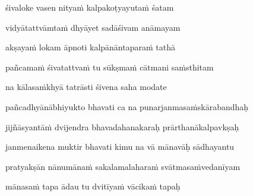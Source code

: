śivaloke vasen nityaṁ kalpakoṭyayutaṁ śatam \veg\dontdisplaylinenum
{}

vidyātattvāmtaṁ dhyāyet sadāśivam anāmayam\thinspace{\dandab} \dontdisplaylinenum
{}

akṣayaṁ lokam āpnoti kalpānāntaparaṁ tathā \veg\dontdisplaylinenum 
{}

pañcamaṁ śivatattvaṁ tu sūkṣmaṁ cātmani saṁsthitam\thinspace{\dandab} \dontdisplaylinenum

na kālasaṁkhyā tatrāsti śivena saha modate \veg\dontdisplaylinenum

\ujvers\nemsloka 
pañcadhyānābhiyukto bhavati ca na punarjanmasaṁskārabandhaḥ
\dontdisplaylinenum
{}

\nemslokab 
jijñāsyantāṁ dvijendra bhavadahanakaraḥ prārthanākalpavkṣaḥ \danda\dontdisplaylinenum
{}

\nemslokac 
janmenaikena muktir bhavati kimu na vā mānavāḥ sādhayantu
\dontdisplaylinenum
{}

\nemslokad 
pratyakṣān nānumānaṁ sakalamalaharaṁ svātmasaṁvedanīyam \veg\dontdisplaylinenum

\vers
{}


mānasaṁ tapa ādau tu dvitīyaṁ vācikaṁ tapaḥ\thinspace{\dandab} \dontdisplaylinenum
{}

